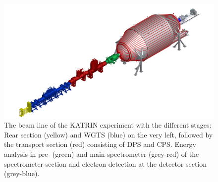       \begin{figure}
			
      		\includegraphics[width = \textwidth]{graphics/katrinExperiment/beamLineHD.jpg}

      	\caption[KATRIN beam line]{The beam line of the KATRIN experiment with the different stages: Rear section (yellow) and WGTS (blue) on the very left, followed by the transport section (red) consisting of DPS and CPS. Energy analysis in pre- (green) and main spectrometer (grey-red) of the spectrometer section and electron detection at the detector section (grey-blue).}
      	\label{fig:beamLine}
      \end{figure}

      
